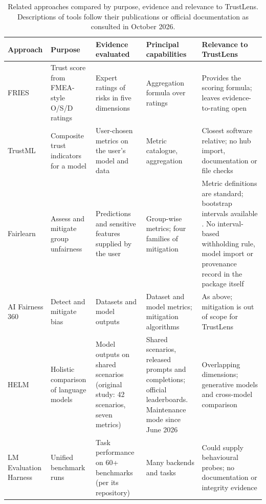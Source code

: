 \begin{table}[!htbp]
\centering\footnotesize\setlength{\tabcolsep}{3pt}
\caption{Related approaches compared by purpose, evidence and relevance to TrustLens. Descriptions of tools follow their publications or official documentation as consulted in October 2026.}\label{tab:litmatrix}
\begin{tabularx}{\textwidth}{|>{\raggedright\arraybackslash}p{2.1cm}|>{\raggedright\arraybackslash}p{2.7cm}|>{\raggedright\arraybackslash}p{2.6cm}|>{\raggedright\arraybackslash}p{3.1cm}|L|}
\hline
\textbf{Approach} & \textbf{Purpose} & \textbf{Evidence evaluated} & \textbf{Principal capabilities} & \textbf{Relevance to TrustLens}\\
\hline
FRIES \cite{rutinowski2024} & Trust score from FMEA-style O/S/D ratings & Expert ratings of risks in five dimensions & Aggregation formula over ratings & Provides the scoring formula; leaves evidence-to-rating open\\ \hline
TrustML \cite{manzano2024} & Composite trust indicators for a model & User-chosen metrics on the user's model and data & Metric catalogue, aggregation & Closest software relative; no hub import, documentation or file checks\\ \hline
Fairlearn \cite{weerts2023fairlearn} & Assess and mitigate group unfairness & Predictions and sensitive features supplied by the user & Group-wise metrics; four families of mitigation & Metric definitions are standard; bootstrap intervals available \cite{fairlearnci}. No interval-based withholding rule, model import or provenance record in the package itself\\ \hline
AI Fairness 360 \cite{bellamy2019aif360} & Detect and mitigate bias & Datasets and model outputs & Dataset and model metrics; mitigation algorithms & As above; mitigation is out of scope for TrustLens\\ \hline
HELM \cite{liang2023helm} & Holistic comparison of language models & Model outputs on shared scenarios (original study: 42 scenarios, seven metrics) & Shared scenarios, released prompts and completions; official leaderboards. Maintenance mode since June 2026 \cite{helmmaint} & Overlapping dimensions; generative models and cross-model comparison\\ \hline
LM Evaluation Harness \cite{gao2024harness} & Unified benchmark runs & Task performance on 60+ benchmarks (per its repository) & Many backends and tasks & Could supply behavioural probes; no documentation or integrity evidence\\ \hline

\end{tabularx}
\end{table}
